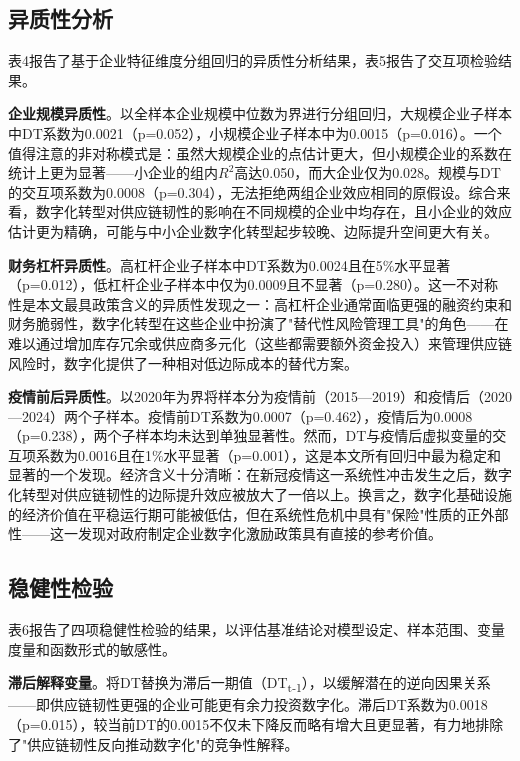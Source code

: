 
\FloatBarrier

\subsection{异质性分析}

表4报告了基于企业特征维度分组回归的异质性分析结果，表5报告了交互项检验结果。

\textbf{企业规模异质性}。以全样本企业规模中位数为界进行分组回归，大规模企业子样本中DT系数为0.0021（p=0.052），小规模企业子样本中为0.0015（p=0.016）。一个值得注意的非对称模式是：虽然大规模企业的点估计更大，但小规模企业的系数在统计上更为显著——小企业的组内$R^2$高达0.050，而大企业仅为0.028。规模与DT的交互项系数为0.0008（p=0.304），无法拒绝两组企业效应相同的原假设。综合来看，数字化转型对供应链韧性的影响在不同规模的企业中均存在，且小企业的效应估计更为精确，可能与中小企业数字化转型起步较晚、边际提升空间更大有关。

\textbf{财务杠杆异质性}。高杠杆企业子样本中DT系数为0.0024且在5\%水平显著（p=0.012），低杠杆企业子样本中仅为0.0009且不显著（p=0.280）。这一不对称性是本文最具政策含义的异质性发现之一：高杠杆企业通常面临更强的融资约束和财务脆弱性，数字化转型在这些企业中扮演了"替代性风险管理工具"的角色——在难以通过增加库存冗余或供应商多元化（这些都需要额外资金投入）来管理供应链风险时，数字化提供了一种相对低边际成本的替代方案。

\textbf{疫情前后异质性}。以2020年为界将样本分为疫情前（2015—2019）和疫情后（2020—2024）两个子样本。疫情前DT系数为0.0007（p=0.462），疫情后为0.0008（p=0.238），两个子样本均未达到单独显著性。然而，DT与疫情后虚拟变量的交互项系数为0.0016且在1\%水平显著（p=0.001），这是本文所有回归中最为稳定和显著的一个发现。经济含义十分清晰：在新冠疫情这一系统性冲击发生之后，数字化转型对供应链韧性的边际提升效应被放大了一倍以上。换言之，数字化基础设施的经济价值在平稳运行期可能被低估，但在系统性危机中具有"保险"性质的正外部性——这一发现对政府制定企业数字化激励政策具有直接的参考价值。



\FloatBarrier

\subsection{稳健性检验}

表6报告了四项稳健性检验的结果，以评估基准结论对模型设定、样本范围、变量度量和函数形式的敏感性。

\textbf{滞后解释变量}。将DT替换为滞后一期值（DT\textsubscript{t-1}），以缓解潜在的逆向因果关系——即供应链韧性更强的企业可能更有余力投资数字化。滞后DT系数为0.0018（p=0.015），较当前DT的0.0015不仅未下降反而略有增大且更显著，有力地排除了"供应链韧性反向推动数字化"的竞争性解释。

